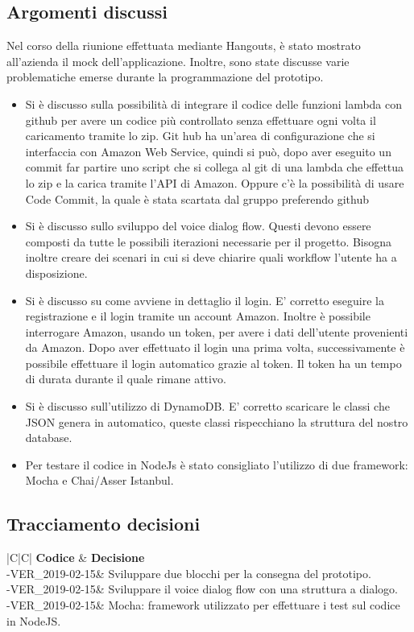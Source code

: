 \documentclass[a4paper,12pt]{article}
\begin{document}
	\subsection{Argomenti discussi}
	Nel corso della riunione effettuata mediante Hangouts, è stato mostrato all'azienda il mock dell'applicazione.  
	Inoltre, sono state discusse varie problematiche emerse durante la programmazione del prototipo.
	\begin{itemize}
		\item {Si è discusso sulla possibilità di integrare il codice delle funzioni lambda con github per avere un codice più controllato senza effettuare ogni volta il caricamento tramite lo zip. Git hub ha  un'area di configurazione che si interfaccia con Amazon Web Service, quindi si può, dopo aver eseguito un commit far partire uno script che si collega al git di una lambda che effettua lo zip e la carica tramite l'API di Amazon. Oppure c'è la possibilità di usare Code Commit, la quale è stata scartata dal gruppo preferendo github}
		\item {Si è discusso sullo sviluppo del voice dialog flow. Questi devono essere composti da tutte le possibili iterazioni necessarie per il progetto. Bisogna inoltre creare dei scenari in cui si deve chiarire quali workflow l'utente ha a disposizione.}
		\item {Si è discusso su come avviene in dettaglio il login. E' corretto eseguire la registrazione e il login tramite un account Amazon. Inoltre è possibile interrogare Amazon, usando un token, per avere i dati dell'utente provenienti da Amazon. Dopo aver effettuato il login una prima volta, successivamente è possibile effettuare il login automatico grazie al token. Il token ha un tempo di durata durante il quale rimane attivo.}
		\item {Si è discusso sull'utilizzo di DynamoDB. E' corretto scaricare le classi che JSON genera in automatico, queste classi rispecchiano la struttura del nostro database.}
		\item {Per testare il codice in NodeJs è stato consigliato l'utilizzo di due framework: Mocha e Chai/Asser Istanbul.}
	\end{itemize}
	\subsection{Tracciamento decisioni}
	\begin{table}[tbph]
		\centering
		\begin{tabularx}{\textwidth}{|C|C|}
			\hline
			\textbf{Codice } & \textbf{Decisione} \\
			-VER\_2019-02-15& Sviluppare due blocchi per la consegna del prototipo.\\
			-VER\_2019-02-15& Sviluppare il voice dialog flow con una struttura a dialogo.\\
			-VER\_2019-02-15& Mocha: framework utilizzato per effettuare i test sul codice in NodeJS.\\
			
			\hline
		\end{tabularx}
		\caption{Tracciamento decisioni}
	\end{table}
	\label{LastPage}
\end{document}
